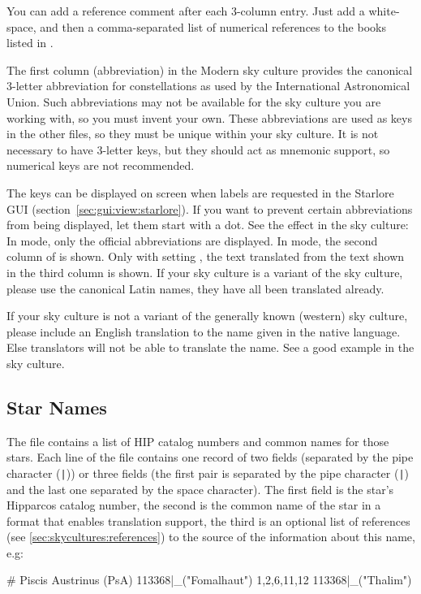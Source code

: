 You can  add a reference comment after each
3-column entry. Just add a white-space, and then a comma-separated list
of numerical references to the books listed in .

The first column (abbreviation) in the Modern sky culture provides
the canonical 3-letter abbreviation for constellations as used by the
International Astronomical Union. Such abbreviations may not be
available for the sky culture you are working with, so you must invent
your own. These abbreviations are used as keys in the other files, so
they must be unique within your sky culture. It is not necessary to have
3-letter keys, but they should act as mnemonic support, so numerical keys are not recommended. 

The keys can be displayed on screen when labels are requested in the
Starlore GUI (section~\ref{sec:gui:view:starlore}). If you want to prevent
certain abbreviations from being displayed, let them start with a
dot. See the effect in the  sky culture: In
 mode, only the official abbreviations are
displayed. In  mode, the second column of
 is shown. Only with setting
, the text translated from the text shown in the
third column is shown. If your sky culture is a variant of the 
sky culture, please use the canonical Latin names, they have all been translated already.

If your sky culture is not a variant of the generally known  (western)
sky culture, please include an English translation to the name given in
the native language. Else translators will not be able to translate
the name. See a good example in the  sky culture.

\subsection{Star Names}
\label{sec:skycultures:starnames}

The file  contains a list of HIP catalog
numbers and common names for those stars. Each line of the file
contains one record of two fields (separated by the pipe character
(\texttt{|})) or three fields (the first pair is separated by the 
pipe character (\texttt{|}) and the last one separated by the space 
character). The first field is the star's Hipparcos catalog number,
the second is the common name of the star in a format that enables
translation support, the third is an optional list of references (see \ref{sec:skycultures:references})  
to the source of the information about this name, e.g:
\begin{configfile}
# Piscis Austrinus (PsA)
113368|_("Fomalhaut") 1,2,6,11,12
113368|_("Thalim")
\end{configfile}

